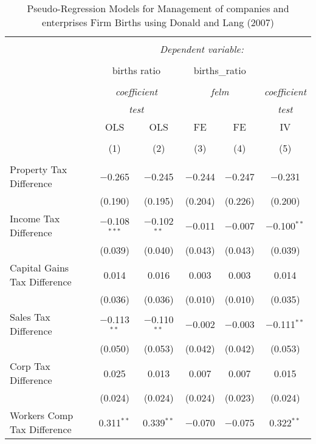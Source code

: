 
\begin{table}[!htbp] \centering 
  \caption{Pseudo-Regression Models for  Management of companies and enterprises Firm Births using Donald and Lang (2007)} 
  \label{} 
\begin{tabular}{@{\extracolsep{5pt}}lccccc} 
\\[-1.8ex]\hline 
\hline \\[-1.8ex] 
 & \multicolumn{5}{c}{\textit{Dependent variable:}} \\ 
\cline{2-6} 
\\[-1.8ex] & \multicolumn{2}{c}{births ratio} & \multicolumn{2}{c}{births\_ratio} &   \\ 
\\[-1.8ex] & \multicolumn{2}{c}{\textit{coefficient}} & \multicolumn{2}{c}{\textit{felm}} & \textit{coefficient} \\ 
 & \multicolumn{2}{c}{\textit{test}} & \multicolumn{2}{c}{\textit{}} & \textit{test} \\ 
 & OLS & OLS & FE & FE & IV \\ 
\\[-1.8ex] & (1) & (2) & (3) & (4) & (5)\\ 
\hline \\[-1.8ex] 
 Property Tax Difference & $-$0.265 & $-$0.245 & $-$0.244 & $-$0.247 & $-$0.231 \\ 
  & (0.190) & (0.195) & (0.204) & (0.226) & (0.200) \\ 
  Income Tax Difference & $-$0.108$^{***}$ & $-$0.102$^{**}$ & $-$0.011 & $-$0.007 & $-$0.100$^{**}$ \\ 
  & (0.039) & (0.040) & (0.043) & (0.043) & (0.039) \\ 
  Capital Gains Tax Difference & 0.014 & 0.016 & 0.003 & 0.003 & 0.014 \\ 
  & (0.036) & (0.036) & (0.010) & (0.010) & (0.035) \\ 
  Sales Tax Difference & $-$0.113$^{**}$ & $-$0.110$^{**}$ & $-$0.002 & $-$0.003 & $-$0.111$^{**}$ \\ 
  & (0.050) & (0.053) & (0.042) & (0.042) & (0.053) \\ 
  Corp Tax Difference & 0.025 & 0.013 & 0.007 & 0.007 & 0.015 \\ 
  & (0.024) & (0.024) & (0.024) & (0.023) & (0.024) \\ 
  Workers Comp Tax Difference & 0.311$^{**}$ & 0.339$^{**}$ & $-$0.070 & $-$0.075 & 0.322$^{**}$ \\ 

\end{tabular}
\end{table}
